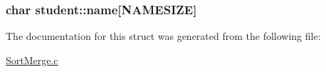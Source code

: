 \subsubsection[{\texorpdfstring{name}{name}}]{\setlength{\rightskip}{0pt plus 5cm}char student\+::name\mbox{[}{\bf N\+A\+M\+E\+S\+I\+ZE}\mbox{]}}\hypertarget{structstudent_a4cc31cdf611c0cce37bba9239ea27ae3}{}\label{structstudent_a4cc31cdf611c0cce37bba9239ea27ae3}


The documentation for this struct was generated from the following file\+:\begin{DoxyCompactItemize}
\item 
\hyperlink{SortMerge_8c}{Sort\+Merge.\+c}\end{DoxyCompactItemize}
